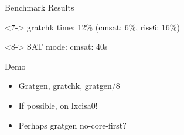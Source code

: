 \documentclass[fleqn]{beamer}
\begin{document}
\begin{frame}{Benchmark Results}
  \vfill
  \begin{uncoverenv}<7->
  gratchk time: 12\% (cmsat: 6\%, riss6: 16\%)
  \end{uncoverenv}  
  
  \vfill
  
  \begin{uncoverenv}<8->
  SAT mode: cmsat: 40s
  \end{uncoverenv}  
  

\end{frame}
\begin{frame}{Demo}
  \begin{itemize}
   \item Gratgen, gratchk, gratgen/8
   \item If possible, on lxcisa0!

   \item Perhaps gratgen no-core-first?
  


\end{itemize}
\end{frame}
\end{document}
